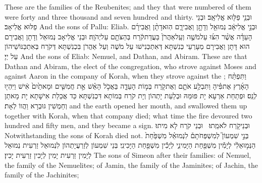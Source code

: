 {These are the families of the Reubenites; and they that were numbered of them were forty and three thousand and seven hundred and thirty.}{}
{וּבְנֵ֥י פַלּ֖וּא אֱלִיאָֽב׃}
{וּבְנֵי פַלּוּא אֱלִיאָב׃}
{And the sons of Pallu: Eliab.}{}
{וּבְנֵ֣י אֱלִיאָ֔ב נְמוּאֵ֖ל וְדָתָ֣ן וַאֲבִירָ֑ם הֽוּא\maqqaf דָתָ֨ן וַאֲבִירָ֜ם  הָעֵדָ֗ה אֲשֶׁ֨ר הִצּ֜וּ עַל\maqqaf מֹשֶׁ֤ה וְעַֽל\maqqaf אַהֲרֹן֙ בַּעֲדַת\maqqaf קֹ֔רַח בְּהַצֹּתָ֖ם עַל\maqqaf יְהֹוָֽה׃}
{וּבְנֵי אֱלִיאָב נְמוּאֵל וְדָתָן וַאֲבִירָם הוּא דָּתָן וַאֲבִירָם מְעָרְעֵי כְּנִשְׁתָּא דְּאִתְכְּנִישׁוּ עַל מֹשֶׁה וְעַל אַהֲרֹן בִּכְנִשְׁתָּא דְּקֹרַח בְּאִתְכַּנּוֹשֵׁיהוֹן עַל יְיָ׃}
{And the sons of Eliab: Nemuel, and Dathan, and Abiram. These are that Dathan and Abiram, the elect of the congregation, who strove against Moses and against Aaron in the company of Korah, when they strove against the \lord;}{}
{וַתִּפְתַּ֨ח הָאָ֜רֶץ אֶת\maqqaf פִּ֗יהָ וַתִּבְלַ֥ע אֹתָ֛ם וְאֶת\maqqaf קֹ֖רַח בְּמ֣וֹת הָעֵדָ֑ה בַּאֲכֹ֣ל הָאֵ֗שׁ אֵ֣ת חֲמִשִּׁ֤ים וּמָאתַ֙יִם֙ אִ֔ישׁ וַיִּהְי֖וּ לְנֵֽס׃}
{וּפְתַחַת אַרְעָא יָת פּוּמַּהּ וּבְלַעַת יָתְהוֹן וְיָת קֹרַח בְּמוֹתָא דִּכְנִשְׁתָּא כַּד אֲכַלַת אִישָׁתָא יָת מָאתַן וְחַמְשִׁין גּוּבְרָא וַהֲווֹ לְאָת׃}
{and the earth opened her mouth, and swallowed them up together with Korah, when that company died; what time the fire devoured two hundred and fifty men, and they became a sign.}{}
{וּבְנֵי\maqqaf קֹ֖רַח לֹא\maqqaf מֵֽתוּ׃ \setuma }
{וּבְנֵי קֹרַח לָא מִיתוּ׃}
{Notwithstanding the sons of Korah died not.}{}
{בְּנֵ֣י שִׁמְעוֹן֮ לְמִשְׁפְּחֹתָם֒ לִנְמוּאֵ֗ל מִשְׁפַּ֙חַת֙ הַנְּמ֣וּאֵלִ֔י לְיָמִ֕ין מִשְׁפַּ֖חַת הַיָּמִינִ֑י לְיָכִ֕ין מִשְׁפַּ֖חַת הַיָּכִינִֽי׃}
{בְּנֵי שִׁמְעוֹן לְזַרְעֲיָתְהוֹן לִנְמוּאֵל זַרְעִית נְמוּאֵל לְיָמִין זַרְעִית יָמִין לְיָכִין זַרְעִית יָכִין׃}
{The sons of Simeon after their families: of Nemuel, the family of the Nemuelites; of Jamin, the family of the Jaminites; of Jachin, the family of the Jachinites;}{}
